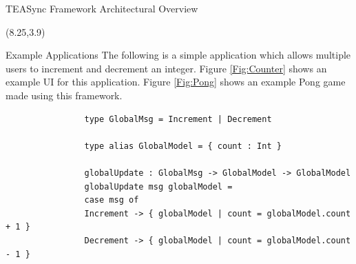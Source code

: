 \documentclass[22pt]{beamer}
\begin{document}
\begin{frame}[fragile]
\begin{textblock}{7.25}
        \begin{block}{\fontsize{37}{20}\selectfont TEASync Framework Architectural Overview}
            \vspace{-6mm}
        \end{block}
    \end{textblock}

    \begin{textblock}{7.25}(8.25,3.9)
        \begin{block}{\fontsize{37}{20}\selectfont Example Applications}
            The following is a simple application which allows multiple users to increment and decrement an
            integer. Figure \ref{Fig:Counter} shows an example UI for this application. Figure \ref{Fig:Pong} shows an example Pong game made using this framework.

            \begin{Verbatim}
                type GlobalMsg = Increment | Decrement

                type alias GlobalModel = { count : Int }

                globalUpdate : GlobalMsg -> GlobalModel -> GlobalModel
                globalUpdate msg globalModel =
                case msg of
                Increment -> { globalModel | count = globalModel.count + 1 }
                Decrement -> { globalModel | count = globalModel.count - 1 }
            \end{Verbatim}


\end{block}
\end{textblock}
\end{frame}
\end{document}
